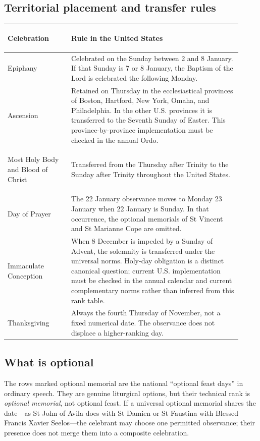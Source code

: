 \subsection{Territorial placement and transfer rules}

\begin{longtable}{>{\bfseries\raggedright\arraybackslash}p{0.25\linewidth}>{\raggedright\arraybackslash}p{0.67\linewidth}}
\toprule
Celebration & Rule in the United States\\
\midrule
\endhead
Epiphany & Celebrated on the Sunday between 2 and 8 January. If that Sunday is 7 or 8 January, the Baptism of the Lord is celebrated the following Monday.\\
Ascension & Retained on Thursday in the ecclesiastical provinces of Boston, Hartford, New York, Omaha, and Philadelphia. In the other U.S. provinces it is transferred to the Seventh Sunday of Easter. This province-by-province implementation must be checked in the annual Ordo.\\
Most Holy Body and Blood of Christ & Transferred from the Thursday after Trinity to the Sunday after Trinity throughout the United States.\\
Day of Prayer & The 22 January observance moves to Monday 23 January when 22 January is Sunday. In that occurrence, the optional memorials of St Vincent and St Marianne Cope are omitted.\\
Immaculate Conception & When 8 December is impeded by a Sunday of Advent, the solemnity is transferred under the universal norms. Holy-day obligation is a distinct canonical question; current U.S. implementation must be checked in the annual calendar and current complementary norms rather than inferred from this rank table.\\
Thanksgiving & Always the fourth Thursday of November, not a fixed numerical date. The observance does not displace a higher-ranking day.\\
\bottomrule
\end{longtable}

\subsection{What is optional}

The rows marked optional memorial are the national “optional feast days” in ordinary speech. They are genuine liturgical options, but their technical rank is \emph{optional memorial}, not optional feast. If a universal optional memorial shares the date---as St John of Avila does with St Damien or St Faustina with Blessed Francis Xavier Seelos---the celebrant may choose one permitted observance; their presence does not merge them into a composite celebration.
